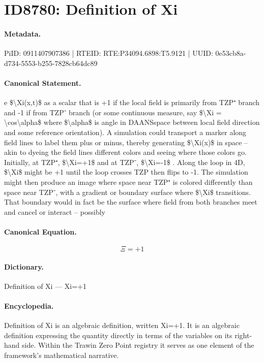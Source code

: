 \section*{ID8780: Definition of Xi}
\paragraph{Metadata.}
PiID: 0911407907386 | RTEID: RTE:P34094.6898:T5.9121 | UUID: 0e53cb8a-d734-5553-b255-7828cb64dc89

\paragraph{Canonical Statement.}
e \$\textbackslash{}Xi(x,t)\$ as a scalar that is +1 if the local field is primarily from TZP⁺ branch and -1 if from TZP⁻ branch (or some continuous measure, say \$\textbackslash{}Xi = \textbackslash{}cos\textbackslash{}alpha\$ where \$\textbackslash{}alpha\$ is angle in DAANSspace between local field direction and some reference orientation). A simulation could transport a marker along field lines to label them plus or minus, thereby generating \$\textbackslash{}Xi(x)\$ in space – akin to dyeing the field lines different colors and seeing where those colors go. Initially, at TZP⁺, \$\textbackslash{}Xi=+1\$ and at TZP⁻, \$\textbackslash{}Xi=-1\$ . Along the loop in 4D, \$\textbackslash{}Xi\$ might be +1 until the loop crosses TZP then flips to -1. The simulation might then produce an image where space near TZP⁺ is colored differently than space near TZP⁻, with a gradient or boundary surface where \$\textbackslash{}Xi\$ transitions. That boundary would in fact be the surface where field from both branches meet and cancel or interact – possibly

\paragraph{Canonical Equation.}
\[
\Xi=+1
\]

\paragraph{Dictionary.}
Definition of Xi — Xi=+1

\paragraph{Encyclopedia.}
Definition of Xi is an algebraic definition, written Xi=+1. It is an algebraic definition expressing the quantity directly in terms of the variables on its right-hand side. Within the Trawin Zero Point registry it serves as one element of the framework's mathematical narrative.
